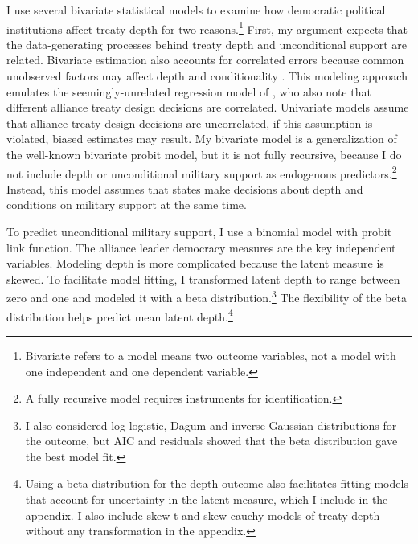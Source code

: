 \documentclass[12pt]{article}
\begin{document}
I use several bivariate statistical models to examine how democratic political institutions affect treaty depth for two reasons.\footnote{Bivariate refers to a model means two outcome variables, not a model with one independent and one dependent variable.} 
First, my argument expects that the data-generating processes behind treaty depth and unconditional support are related. 
Bivariate estimation also accounts for correlated errors because common unobserved factors may affect depth and conditionality \citep{Braumoelleretal2018}.
This modeling approach emulates the seemingly-unrelated regression model of \citet{FjelstulReiter2019}, who also note that different alliance treaty design decisions are correlated. 
Univariate models assume that alliance treaty design decisions are uncorrelated, if this assumption is violated, biased estimates may result. 
My bivariate model is a generalization of the well-known bivariate probit model, but it is not fully recursive, because I do not include depth or unconditional military support as endogenous predictors.\footnote{A fully recursive model requires instruments for identification.}  
Instead, this model assumes that states make decisions about depth and conditions on military support at the same time. 


To predict unconditional military support, I use a binomial model with probit link function. 
The alliance leader democracy measures are the key independent variables.
Modeling depth is more complicated because the latent measure is skewed.
To facilitate model fitting, I transformed latent depth to range between zero and one and modeled it with a beta distribution.\footnote{I also considered log-logistic, Dagum and inverse Gaussian distributions for the outcome, but AIC and residuals showed that the beta distribution gave the best model fit.}
The flexibility of the beta distribution helps predict mean latent depth.\footnote{Using a beta distribution for the depth outcome also facilitates fitting models that account for uncertainty in the latent measure, which I include in the appendix. I also include skew-t and skew-cauchy models of treaty depth without any transformation in the appendix.} 
\end{document}
